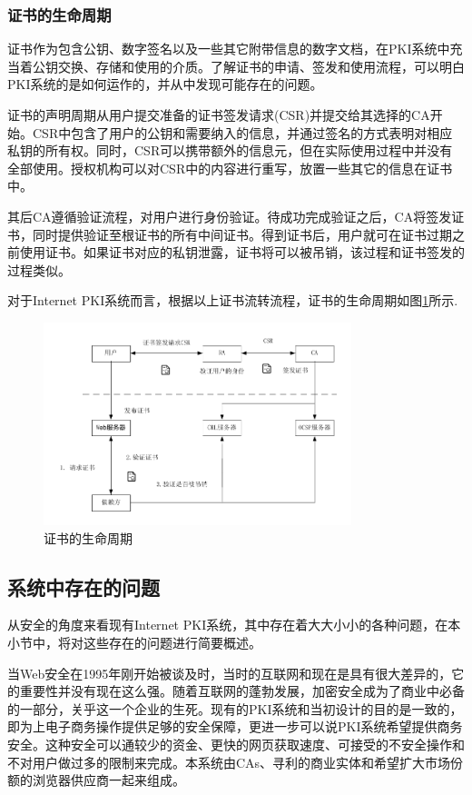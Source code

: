 \subsubsection{证书的生命周期}


证书作为包含公钥、数字签名以及一些其它附带信息的数字文档，在PKI系统中充当着公钥交换、存储和使用的介质。了解证书的申请、签发和使用流程，可以明白PKI系统的是如何运作的，并从中发现可能存在的问题。

证书的声明周期从用户提交准备的证书签发请求(CSR)并提交给其选择的CA开始。CSR中包含了用户的公钥和需要纳入的信息，并通过签名的方式表明对相应私钥的所有权。同时，CSR可以携带额外的信息元，但在实际使用过程中并没有全部使用。授权机构可以对CSR中的内容进行重写，放置一些其它的信息在证书中。

其后CA遵循验证流程，对用户进行身份验证。待成功完成验证之后，CA将签发证书，同时提供验证至根证书的所有中间证书。得到证书后，用户就可在证书过期之前使用证书。如果证书对应的私钥泄露，证书将可以被吊销，该过程和证书签发的过程类似。

对于Internet PKI系统而言，根据以上证书流转流程，证书的生命周期如图\ref{fig:cert_lifecycle}所示.

\begin{figure}[htbp]
 	\centering
 	\includegraphics[width = 0.8\textwidth]{img/cert_lifecycle}
 	\caption{证书的生命周期}\label{fig:cert_lifecycle}
\end{figure}

\subsection{系统中存在的问题}

从安全的角度来看现有Internet PKI系统，其中存在着大大小小的各种问题，在本小节中，将对这些存在的问题进行简要概述。

当Web安全在1995年刚开始被谈及时，当时的互联网和现在是具有很大差异的，它的重要性并没有现在这么强。随着互联网的蓬勃发展，加密安全成为了商业中必备的一部分，关乎这一个企业的生死。现有的PKI系统和当初设计的目的是一致的，即为上电子商务操作提供足够的安全保障，更进一步可以说PKI系统希望提供商务安全。这种安全可以通较少的资金、更快的网页获取速度、可接受的不安全操作和不对用户做过多的限制来完成。本系统由CAs、寻利的商业实体和希望扩大市场份额的浏览器供应商一起来组成。

